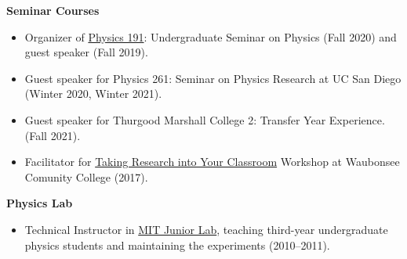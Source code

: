 \documentclass[11pt]{res}
\begin{document}
\begin{resume}
  \textbf{Seminar Courses}
  \begin{itemize}
    \itemsep-0.3em
    \item Organizer of \href{https://indico.cern.ch/event/956641/}{Physics 191}: Undergraduate Seminar on Physics ({Fall 2020}) and guest speaker ({Fall 2019}).
    \item Guest speaker for Physics 261: Seminar on Physics Research at UC San Diego ({Winter 2020, Winter 2021}).
    \item Guest speaker for Thurgood Marshall College 2: Transfer Year Experience. ({Fall 2021}).
    \item Facilitator for \href{http://eddata.fnal.gov/lasso/program_search/show_workshopID_new.lasso?event_id=435}{Taking Research into Your Classroom} Workshop at Waubonsee Comunity College ({2017}).
  \end{itemize}


  \textbf{Physics Lab}
  \begin{itemize}
    \itemsep-0.3em
    \item Technical Instructor in \href{http://web.mit.edu/8.13/www/index.shtml}{MIT Junior Lab}, teaching third-year undergraduate physics students and maintaining the experiments ({2010--2011}).
  \end{itemize}



\end{resume}
\end{document}
